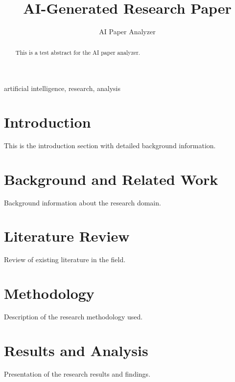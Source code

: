 \documentclass[conference]{IEEEtran}
\title{AI-Generated Research Paper}
\author{AI Paper Analyzer}
\begin{document}
\maketitle

\begin{abstract}
This is a test abstract for the AI paper analyzer.
\end{abstract}

\begin{IEEEkeywords}
artificial intelligence, research, analysis
\end{IEEEkeywords}

\section{Introduction}
This is the introduction section with detailed background information.

\section{Background and Related Work}
Background information about the research domain.

\section{Literature Review}
Review of existing literature in the field.

\section{Methodology}
Description of the research methodology used.

\section{Results and Analysis}
Presentation of the research results and findings.

\end{document}
